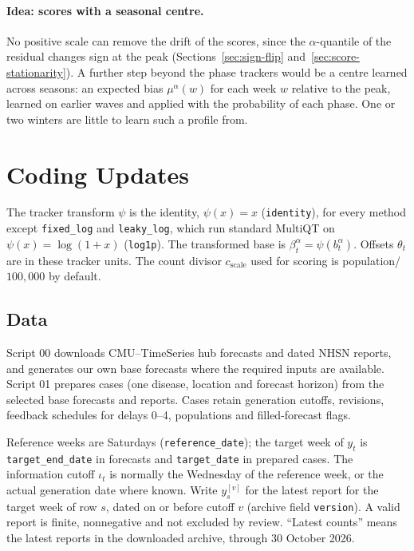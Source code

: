 \documentclass[11pt,a4paper]{article}
\theoremstyle{definition}
\theoremstyle{remark}
\begin{document}
\paragraph{Idea: scores with a seasonal centre.} No positive scale can
remove the drift of the scores, since the $\alpha$-quantile of the residual
changes sign at the peak (Sections~\ref{sec:sign-flip}
and~\ref{sec:score-stationarity}). A further step beyond the phase
trackers would be a centre learned across seasons: an expected bias
$\mu^\alpha(w)$ for each week $w$ relative to the peak, learned on earlier
waves and applied with the probability of each phase. One or two winters
are little to learn such a profile from.

\clearpage

\section{Coding Updates}
The tracker transform $\psi$ is the identity, $\psi(x)=x$
(\texttt{identity}), for every method except \texttt{fixed\_log} and
\texttt{leaky\_log}, which run standard MultiQT on $\psi(x)=\log(1+x)$
(\texttt{log1p}). The transformed base is $\beta_t^\alpha=\psi(b_t^\alpha)$.
Offsets $\theta_t$ are in these tracker units. The count divisor $c_{\mathrm{scale}}$ used for scoring
is population/$100{,}000$ by default.

\subsection{Data}
\label{sec:data-preparation}
Script 00 downloads CMU--TimeSeries hub forecasts and dated NHSN reports,
and generates our own base forecasts where the required inputs are available.
Script 01 prepares cases (one disease, location and forecast horizon)
from the selected base forecasts and reports.
Cases retain generation cutoffs, revisions, feedback schedules for
delays 0--4, populations and filled-forecast flags.

Reference weeks are Saturdays (\texttt{reference\_date}); the target
week of $y_t$ is \texttt{target\_end\_date} in forecasts and
\texttt{target\_date} in prepared cases. The information cutoff
$\iota_t$ is normally the Wednesday of the reference week, or the actual
generation date where known. Write $y_s^{[v]}$ for the latest report
for the target week of row $s$, dated on or before cutoff $v$
(archive field \texttt{version}). A valid report is finite, nonnegative
and not excluded by review.
``Latest counts'' means the latest reports in the downloaded archive,
through 30 October 2026.
\end{document}
